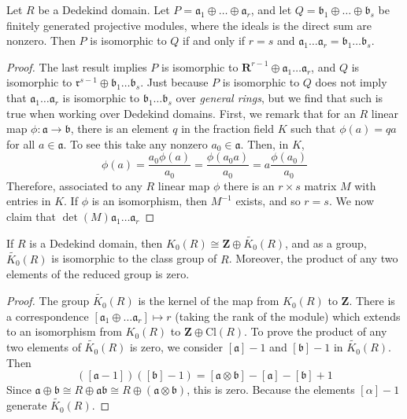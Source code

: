 \begin{theorem}[Steinitz]
    Let $R$ be a Dedekind domain. Let $P = \mathfrak{a}_1 \oplus \dots \oplus \mathfrak{a}_r$, and let $Q = \mathfrak{b}_1 \oplus \dots \oplus \mathfrak{b}_s$ be finitely generated projective modules, where the ideals is the direct sum are nonzero. Then $P$ is isomorphic to $Q$ if and only if $r = s$ and $\mathfrak{a}_1 \dots \mathfrak{a}_r = \mathfrak{b}_1 \dots \mathfrak{b}_s$.
\end{theorem}
\begin{proof}
    The last result implies $P$ is isomorphic to $\mathbf{R}^{r-1} \oplus \mathfrak{a}_1 \dots \mathfrak{a}_r$, and $Q$ is isomorphic to $\mathfrak{r}^{s-1} \oplus \mathfrak{b}_1 \dots \mathfrak{b}_s$. Just because $P$ is isomorphic to $Q$ does not imply that $\mathfrak{a}_1 \dots \mathfrak{a}_r$ is isomorphic to $\mathfrak{b}_1 \dots \mathfrak{b}_s$ over {\it general rings}, but we find that such is true when working over Dedekind domains. First, we remark that for an $R$ linear map $\phi: \mathfrak{a} \to \mathfrak{b}$, there is an element $q$ in the fraction field $K$ such that $\phi(a) = qa$ for all $a \in \mathfrak{a}$. To see this take any nonzero $a_0 \in \mathfrak{a}$. Then, in $K$,
    \[ \phi(a) = \frac{a_0 \phi(a)}{a_0} = \frac{\phi(a_0 a)}{a_0} = a \frac{\phi(a_0)}{a_0} \]
    Therefore, associated to any $R$ linear map $\phi$ there is an $r \times s$ matrix $M$ with entries in $K$. If $\phi$ is an isomorphism, then $M^{-1}$ exists, and so $r = s$. We now claim that $\det(M) \mathfrak{a}_1 \dots \mathfrak{a}_r$
\end{proof}

\begin{corollary}
    If $R$ is a Dedekind domain, then $K_0(R) \cong \mathbf{Z} \oplus \widetilde{K_0}(R)$, and as a group, $\widetilde{K_0}(R)$ is isomorphic to the class group of $R$. Moreover, the product of any two elements of the reduced group is zero.
\end{corollary}
\begin{proof}
    The group $\widetilde{K_0}(R)$ is the kernel of the map from $K_0(R)$ to $\mathbf{Z}$. There is a correspondence $[\mathfrak{a}_1 \oplus \dots \mathfrak{a}_r] \mapsto r$ (taking the rank of the module) which extends to an isomorphism from $K_0(R)$ to $\mathbf{Z} \oplus \text{Cl}(R)$. To prove the product of any two elements of $\tilde{K_0}(R)$ is zero, we consider $[\mathfrak{a}] - 1$ and $[\mathfrak{b}] - 1$ in $\tilde{K_0}(R)$. Then
    \[ ([\mathfrak{a} - 1])([\mathfrak{b}] - 1) = [\mathfrak{a} \otimes \mathfrak{b}] - [\mathfrak{a}] - [\mathfrak{b}] + 1 \]
    Since $\mathfrak{a} \oplus \mathfrak{b} \cong R \oplus \mathfrak{a} \mathfrak{b} \cong R \oplus (\mathfrak{a} \otimes \mathfrak{b})$, this is zero. Because the elements $[\mathfrak{\alpha}] - 1$ generate $\tilde{K_0}(R)$.
\end{proof}

